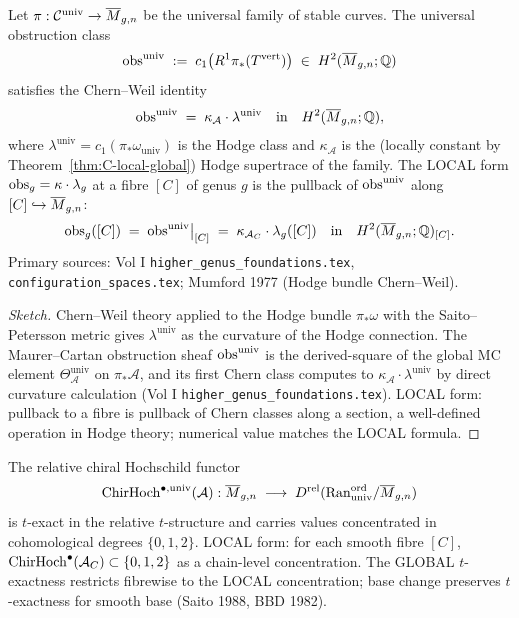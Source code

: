 \begin{theorem}\ClaimStatusTheorem
\label{thm:D-local-global}
Let $\pi: \mathcal{C}^{\mathrm{univ}} \to \overline{M}_{g,n}$ be the
universal family of stable curves. The universal obstruction class
\[
  \mathrm{obs}^{\mathrm{univ}}
  \;:=\; c_1\big(R^1 \pi_*(T^{\mathrm{vert}})\big)
  \;\in\; H^2(\overline{M}_{g,n}; \mathbb{Q})
\]
satisfies the Chern--Weil identity
\[
  \mathrm{obs}^{\mathrm{univ}} \;=\; \kappa_{\mathcal{A}} \cdot \lambda^{\mathrm{univ}}
  \quad\text{in}\quad H^2(\overline{M}_{g,n}; \mathbb{Q}),
\]
where $\lambda^{\mathrm{univ}} = c_1(\pi_* \omega_{\mathrm{univ}})$ is
the Hodge class and $\kappa_{\mathcal{A}}$ is the (locally constant
by Theorem~\ref{thm:C-local-global}) Hodge supertrace of the family.
The LOCAL form $\mathrm{obs}_g = \kappa \cdot \lambda_g$ at a fibre $[C]$ of
genus $g$ is the pullback of $\mathrm{obs}^{\mathrm{univ}}$ along
$[C] \hookrightarrow \overline{M}_{g,n}$:
\[
  \mathrm{obs}_g([C]) \;=\; \mathrm{obs}^{\mathrm{univ}}\big|_{[C]}
  \;=\; \kappa_{\mathcal{A}_C} \cdot \lambda_g([C])
  \quad\text{in}\quad H^2(\overline{M}_{g,n}; \mathbb{Q})_{[C]}.
\]
Primary sources: Vol I \texttt{higher\_genus\_foundations.tex},
\texttt{configuration\_spaces.tex}; Mumford 1977 (Hodge bundle
Chern--Weil).
\end{theorem}

\begin{proof}[Sketch]
Chern--Weil theory applied to the Hodge bundle $\pi_* \omega$ with the
Saito--Petersson metric gives $\lambda^{\mathrm{univ}}$ as the
curvature of the Hodge connection. The Maurer--Cartan obstruction
sheaf $\mathrm{obs}^{\mathrm{univ}}$ is the derived-square of the global MC
element $\Theta_{\mathcal{A}}^{\mathrm{univ}}$ on $\pi_* \mathcal{A}$,
and its first Chern class computes to $\kappa_{\mathcal{A}} \cdot
\lambda^{\mathrm{univ}}$ by direct curvature calculation (Vol I
\texttt{higher\_genus\_foundations.tex}). LOCAL form: pullback to
a fibre is pullback of Chern classes along a section, a well-defined
operation in Hodge theory; numerical value matches the LOCAL formula.
\end{proof}

\begin{theorem}
\ClaimStatusTheorem
\label{thm:H-local-global}
The relative chiral Hochschild functor
\[
  \mathrm{ChirHoch}^{\bullet, \mathrm{univ}}(\mathcal{A}): \overline{M}_{g,n}
  \;\longrightarrow\; D^{\mathrm{rel}}(\mathrm{Ran}^{\mathrm{ord}}_{\mathrm{univ}} / \overline{M}_{g,n})
\]
is $t$-exact in the relative $t$-structure and carries values
concentrated in cohomological degrees $\{0, 1, 2\}$. LOCAL form: for
each smooth fibre $[C]$, $\mathrm{ChirHoch}^\bullet(\mathcal{A}_C) \subset
\{0, 1, 2\}$ as a chain-level concentration. The GLOBAL $t$-exactness
restricts fibrewise to the LOCAL concentration; base change preserves
$t$-exactness for smooth base (Saito 1988, BBD 1982).
\end{theorem}

